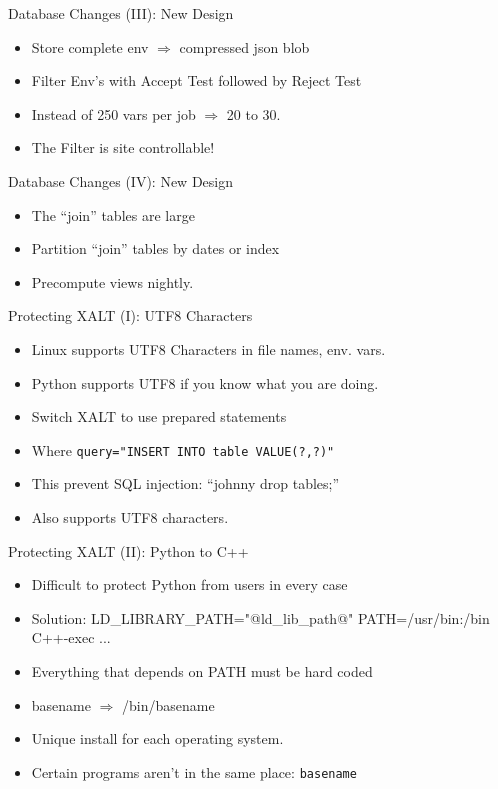 \documentclass{beamer}
\begin{document}
\begin{frame}{Database Changes (III): New Design}
  \begin{itemize}
    \item Store complete env $\Rightarrow$ compressed json blob
    \item Filter Env's with Accept Test followed by Reject Test
    \item Instead of 250 vars per job $\Rightarrow$ 20 to 30.
    \item The Filter is site controllable!
  \end{itemize}
\end{frame}

\begin{frame}{Database Changes (IV): New Design}
  \begin{itemize}
    \item The ``join'' tables are large 
    \item Partition ``join'' tables by dates or index
    \item Precompute views nightly.
  \end{itemize}
\end{frame}

\begin{frame}{Protecting XALT (I): UTF8 Characters}
  \begin{itemize}
    \item Linux supports UTF8 Characters in file names, env. vars.
    \item Python supports UTF8 if you know what you are doing.
    \item Switch XALT to use prepared statements
    \item Where \texttt{query="INSERT INTO table VALUE(?,?)"}
    \item This prevent SQL injection: ``johnny drop tables;''
    \item Also supports UTF8 characters.
  \end{itemize}
\end{frame}

\begin{frame}{Protecting XALT (II): Python to C++}
    \begin{itemize}
      \item Difficult to protect Python from users in every case
      \item Solution: LD\_LIBRARY\_PATH="@ld\_lib\_path@"
        PATH=/usr/bin:/bin C++-exec ...
      \item Everything that depends on PATH must be hard coded
      \item basename $\Rightarrow$ /bin/basename
      \item Unique install for each operating system.
      \item Certain programs aren't in the same place: \texttt{basename}
    \end{itemize}
\end{frame}
\end{document}
